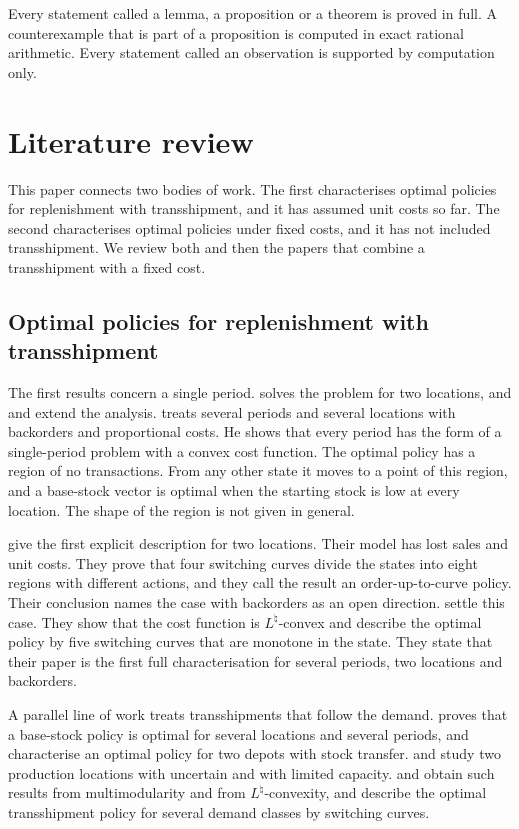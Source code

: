 \documentclass[11pt]{article}
\theoremstyle{definition}
\begin{document}
Every statement called a lemma, a proposition or a theorem is proved in full. A counterexample that is part of a proposition is computed in exact rational arithmetic. Every statement called an observation is supported by computation only.

\section{Literature review}\label{sec:literature}

This paper connects two bodies of work. The first characterises optimal policies for replenishment with transshipment, and it has assumed unit costs so far. The second characterises optimal policies under fixed costs, and it has not included transshipment. We review both and then the papers that combine a transshipment with a fixed cost.

\subsection{Optimal policies for replenishment with transshipment}

The first results concern a single period. \citet{gross1963centralized} solves the problem for two locations, and \citet{das1975supply} and \citet{karmarkar1977one} extend the analysis. \citet{karmarkar1981multiperiod} treats several periods and several locations with backorders and proportional costs. He shows that every period has the form of a single-period problem with a convex cost function. The optimal policy has a region of no transactions. From any other state it moves to a point of this region, and a base-stock vector is optimal when the starting stock is low at every location. The shape of the region is not given in general.

\citet{abouee2015optimal} give the first explicit description for two locations. Their model has lost sales and unit costs. They prove that four switching curves divide the states into eight regions with different actions, and they call the result an order-up-to-curve policy. Their conclusion names the case with backorders as an open direction. \citet{xu2023optimal} settle this case. They show that the cost function is $L^{\natural}$-convex and describe the optimal policy by five switching curves that are monotone in the state. They state that their paper is the first full characterisation for several periods, two locations and backorders.

A parallel line of work treats transshipments that follow the demand. \citet{robinson1990optimal} proves that a base-stock policy is optimal for several locations and several periods, and \citet{archibald1997optimal} characterise an optimal policy for two depots with stock transfer. \citet{hu2008optimal} and \citet{yang2007capacitated} study two production locations with uncertain and with limited capacity. \citet{li2014multimodularity} and \citet{chen2015new} obtain such results from multimodularity and from $L^{\natural}$-convexity, and \citet{van2019optimal} describe the optimal transshipment policy for several demand classes by switching curves.
\end{document}
